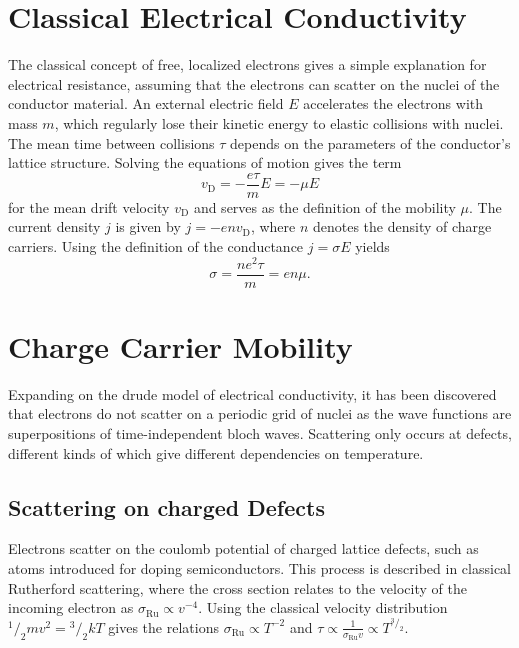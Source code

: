 \section{Classical Electrical Conductivity}
The classical concept of free, localized electrons gives a simple explanation for electrical resistance, assuming that the electrons can scatter on the nuclei of the conductor material.
An external electric field $E$ accelerates the electrons with mass $m$, which regularly lose their kinetic energy to elastic collisions with nuclei.
The mean time between collisions $\tau$ depends on the parameters of the conductor's lattice structure.
Solving the equations of motion gives the term
\begin{equation*}
	v_\text{D} = - \frac{e \tau}{m} E = - \mu E
\end{equation*}
for the mean drift velocity $v_\text{D}$ and serves as the definition of the mobility $\mu$.
The current density $j$ is given by $j = - e n v_\text{D}$, where $n$ denotes the density of charge carriers.
Using the definition of the conductance $j = \sigma E$ yields
\begin{equation}\label{eq:classical-resistance}
	\sigma = \frac{n e^2 \tau}{m} = e n \mu.
\end{equation}

\section{Charge Carrier Mobility}
Expanding on the drude model of electrical conductivity, it has been discovered that electrons do not scatter on a periodic grid of nuclei as the wave functions are superpositions of time-independent bloch waves.
Scattering only occurs at defects, different kinds of which give different dependencies on temperature.

\subsection{Scattering on charged Defects}
Electrons scatter on the coulomb potential of charged lattice defects, such as atoms introduced for doping semiconductors.
This process is described in classical Rutherford scattering, where the cross section relates to the velocity of the incoming electron as $\sigma_\text{Ru} \propto v^{-4}$.
Using the classical velocity distribution $^1/_2 m v^2 = {^3}/_2 k T$ gives the relations $\sigma_\text{Ru} \propto T^{-2}$ and $\tau \propto \frac{1}{\sigma_\text{Ru} v} \propto T^{{^3}/_2}$.

